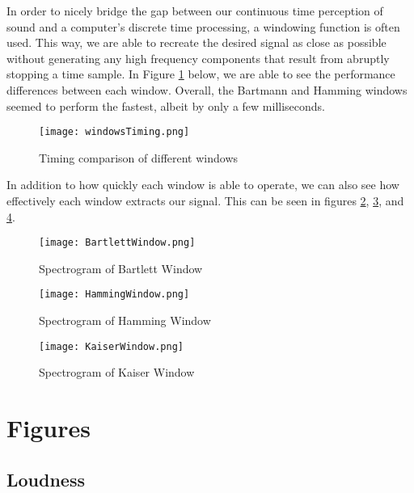 \documentclass{article} %
\begin{document}
In order to nicely bridge the gap between our continuous time perception of sound and a computer's discrete time processing, a windowing function is often used. 
This way, we are able to recreate the desired signal as close as possible without generating any high frequency components that result from abruptly stopping a time sample. 
In Figure \ref{fig:windowsTiming} below, we are able to see the performance differences between each window. Overall, the Bartmann and Hamming windows seemed to perform
the fastest, albeit by only a few milliseconds. 

\begin{figure}[H]
\centering
\texttt{[image: windowsTiming.png]}
\caption{Timing comparison of different windows}
\label{fig:windowsTiming}
\end{figure}



In addition to how quickly each window is able to operate, we can also see how effectively each window extracts our signal. This can be seen in figures \ref{fig:bartWindow},
\ref{fig:hamWindow}, and \ref{fig:kaiserWindow}.


\begin{figure}[h]
\centering
\texttt{[image: BartlettWindow.png]}
\caption{Spectrogram of Bartlett Window}
\label{fig:bartWindow}
\end{figure}


\begin{figure}
\centering
\texttt{[image: HammingWindow.png]}
\caption{Spectrogram of Hamming Window}
\label{fig:hamWindow}
\end{figure}

\begin{figure}
\centering
\texttt{[image: KaiserWindow.png]}
\caption{Spectrogram of Kaiser Window}
\label{fig:kaiserWindow}
\end{figure}

\clearpage
\appendix
\section{Figures}
\subsection{Loudness}
\label{sec:LoudnessFigures}
\end{document}
